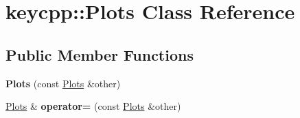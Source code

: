 \hypertarget{classkeycpp_1_1_plots}{\section{keycpp\-:\-:Plots Class Reference}
\label{classkeycpp_1_1_plots}
}
\subsection*{Public Member Functions}
\begin{DoxyCompactItemize}
\item 
\hypertarget{classkeycpp_1_1_plots_ada2764ac9764ec42df312e7226750181}{{\bfseries Plots} (const \hyperlink{classkeycpp_1_1_plots}{Plots} \&other)}\label{classkeycpp_1_1_plots_ada2764ac9764ec42df312e7226750181}

\item 
\hypertarget{classkeycpp_1_1_plots_a15efdc7653ddc4e37d36f97a4240f556}{\hyperlink{classkeycpp_1_1_plots}{Plots} \& {\bfseries operator=} (const \hyperlink{classkeycpp_1_1_plots}{Plots} \&other)}\label{classkeycpp_1_1_plots_a15efdc7653ddc4e37d36f97a4240f556}

\end{DoxyCompactItemize}
